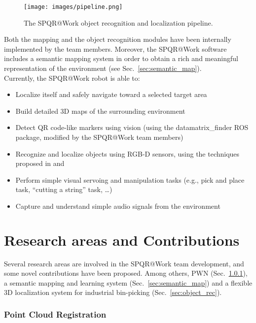 \documentclass[conference]{IEEEtran}
\begin{document}
\begin{figure*}[t!]
\begin{center}
\texttt{[image: images/pipeline.png]}
\end{center}
\caption{The SPQR@Work object recognition and localization pipeline.}\label{fig:pipeline}
\end{figure*}

Both the mapping and the object recognition modules have been internally implemented by the team members.
Moreover, the SPQR@Work software includes a semantic mapping system in order to obtain a rich and meaningful representation of the environment (see Sec.~\ref{sec:semantic_map}).\\

Currently, the SPQR@Work robot is able to:

\begin{itemize}
 \item Localize itself and safely navigate toward a selected target area
 \item Build detailed 3D maps of the surrounding environment
 \item Detect QR code-like markers using vision (using the datamatrix\_finder ROS package, modified by the SPQR@Work team members)
 \item Recognize and localize objects using RGB-D sensors, using the techniques proposed in \cite{antonelloVISIGRAPP2014} and \cite{prettoCASE2013}
 \item Perform simple visual servoing and manipulation tasks (e.g., pick and place task, ``cutting a string'' task, \dots)
 \item Capture and understand simple audio signals from the environment
\end{itemize}

 
\section{Research areas and Contributions}\label{sec:research}

Several research areas are involved in the SPQR@Work team development, and some novel contributions have been proposed. Among others, PWN (Sec.~\ref{sec:pwn}), a semantic mapping and learning system (Sec.~\ref{sec:semantic_map}) and a flexible 3D localization system for industrial bin-picking (Sec.~\ref{sec:object_rec}).

\subsubsection{Point Cloud Registration}\label{sec:pwn}
\end{document}
